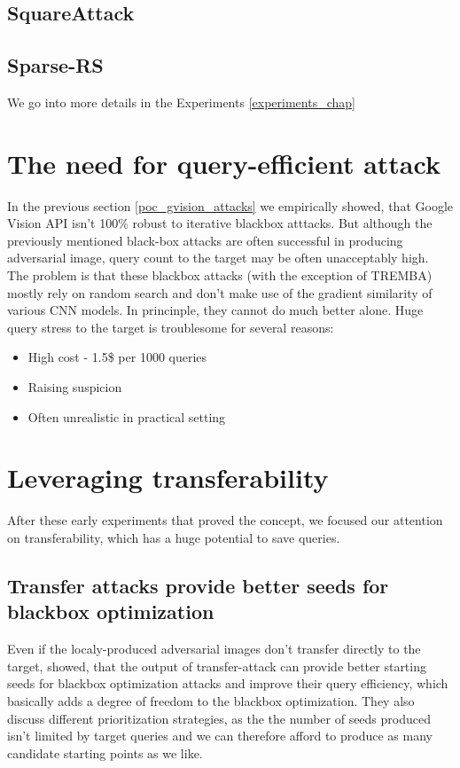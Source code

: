 \subsection{SquareAttack}
\label{square_poc}
\subsection{Sparse-RS}
\label{sparse_rs_poc}

We go into more details in the Experiments \ref{experiments_chap}


\section{The need for query-efficient attack}
In the previous section \ref{poc_gvision_attacks} we empirically showed, that Google Vision API isn't 100\% robust to iterative blackbox atttacks. But although the previously mentioned black-box attacks are often successful in producing adversarial image, query count to the target may be often unacceptably high. The problem is that these blackbox attacks (with the exception of TREMBA) mostly rely on random search and don't make use of the gradient similarity of various CNN models. In princinple, they cannot do much better alone. Huge query stress to the target is troublesome for several reasons:

\begin{itemize}
    \item{High cost - 1.5\$ per 1000 queries}
    \item{Raising suspicion}
    \item{Often unrealistic in practical setting}
\end{itemize}

\section{Leveraging transferability}
\label{Leveraging_transferability}
After these early experiments that proved the concept, we focused our attention on transferability, which has a huge potential to save queries.

\subsection{Transfer attacks provide better seeds for blackbox optimization}
\label{transfer_attack_seeds}
Even if the localy-produced adversarial images don't transfer directly to the target, \cite{Suya2020HybridBA} showed, that the output of transfer-attack can provide better starting seeds for blackbox optimization attacks and improve their query efficiency, which basically adds a degree of freedom to the blackbox optimization. They also discuss different prioritization strategies, as the the number of seeds produced isn't limited by target queries and we can therefore afford to produce as many candidate starting points as we like.

